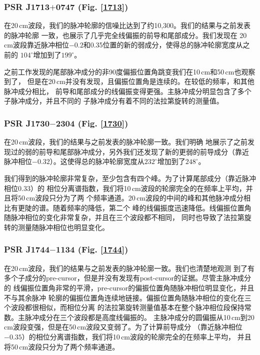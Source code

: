 \subsubsection{PSR J1713$+$0747 (Fig. \ref{1713})}

在20\,cm波段，我们的脉冲轮廓的信噪比达到了约10,300。我们的结果与之前发表的脉冲轮廓
一致\supercite{Ord04,Yan11a}，也展示了几乎完全线偏振的前导和尾部成分。我们发现在
20\,cm波段靠近脉冲相位$-0.2$和0.35位置的新的弱成分，使得总的脉冲轮廓宽度从之前的
$104^{\circ}$增加到了$199^{\circ}$。

之前工作发现的尾部脉冲成分的非90度偏振位置角跳变我们在10\,cm和50\,cm也观察到了，
但是在20\,cm并没有发现，且偏振位置角是连续的。在较低的频率，和其他脉冲成分相比，
前导和尾部成分的线偏振变得更强。主脉冲成分明显包含了多个子脉冲成分，并且不同的
子脉冲成分有着不同的法拉第旋转的测量值。

\subsubsection{PSR J1730$-$2304 (Fig. \ref{1730})}

在20\,cm波段，我们的结果与之前发表的脉冲轮廓一致\supercite{Ord04,Yan11a}。我们明确
地展示了之前发现过的弱的前导和尾部脉冲成分，另外我们还发现了新的更弱的前导成分（靠近
脉冲相位$-0.32$）。这使得总的脉冲轮廓宽度从$232^{\circ}$增加到了$248^{\circ}$。

我们得到的脉冲轮廓非常复杂，至少包含有四个峰。为了计算尾部成分（靠近脉冲相位0.33）的
相位分离谱指数，我们将10\,cm波段的轮廓完全的在频率上平均，并且将50\,cm波段只分为了两
个频率通道。20\,cm波段的中间的峰和其他脉冲成分相比有更陡的谱。随着频率的降低，第二个
峰的线偏振度迅速降低。线偏振位置角随脉冲相位的变化非常复杂，并且在三个波段都不相同，
同时也导致了法拉第旋转的测量随脉冲相位也明显变化。

\subsubsection{PSR J1744$-$1134 (Fig. \ref{1744})}

在20\,cm波段，我们的结果与之前发表的脉冲轮廓一致\supercite{Yan11a}。我们也清楚地观测
到了有多个子成分的pre-cursor，但是并没有发现有post-cursor的证据。尽管主脉冲成分的
线偏振位置角非常的平滑，pre-cursor的偏振位置角随脉冲相位明显变化，并且不与其余脉冲
轮廓的偏振位置角连续地链接。偏振位置角随脉冲相位的变化在三个波段都很相似，而相位分离
的法拉第旋转测量值基本在整个脉冲相位段保持常数。主脉冲成分在三个波段都是高度线偏振的。
主脉冲成分的圆偏振从10\,cm到20\,cm波段变强，但是在50\,cm波段又变弱了。为了计算前导成分
（靠近脉冲相位$-0.35$）的相位分离谱指数，我们将10\,cm波段的轮廓完全的在频率上平均，
并且将50\,cm波段只分为了两个频率通道。

